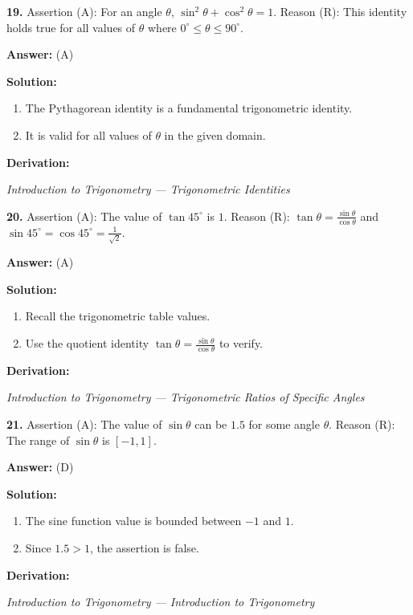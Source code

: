 \documentclass[12pt,a4paper]{exam}
\newcommand{\fitmath}[1]{%
  \sbox{\schmathbox}{$\displaystyle #1$}%
  \ifdim\wd\schmathbox>\linewidth
    \resizebox{\linewidth}{!}{\usebox{\schmathbox}}%
  \else
    \usebox{\schmathbox}%
  \fi}
\begin{document}
\begin{questions}
\question \textbf{19.} Assertion (A): For an angle $\theta$, $\sin^2 \theta + \cos^2 \theta = 1$. Reason (R): This identity holds true for all values of $\theta$ where $0^\circ \le \theta \le 90^\circ$.

\textbf{Answer:}
(A)

\textbf{Solution:}
\begin{enumerate}
  \item The Pythagorean identity is a fundamental trigonometric identity.
  \item It is valid for all values of $\theta$ in the given domain.
\end{enumerate}
\textbf{Derivation:}
\begin{center}
\fitmath{\sin^2 \theta + \cos^2 \theta = 1 \text{ for all } \theta}
\end{center}
\hfill \textit{Introduction to Trigonometry — Trigonometric Identities}
\vspace{0.3cm}

\question \textbf{20.} Assertion (A): The value of $\tan 45^\circ$ is $1$. Reason (R): $\tan \theta = \frac{\sin \theta}{\cos \theta}$ and $\sin 45^\circ = \cos 45^\circ = \frac{1}{\sqrt{2}}$.

\textbf{Answer:}
(A)

\textbf{Solution:}
\begin{enumerate}
  \item Recall the trigonometric table values.
  \item Use the quotient identity $\tan \theta = \frac{\sin \theta}{\cos \theta}$ to verify.
\end{enumerate}
\textbf{Derivation:}
\begin{center}
\fitmath{\tan 45^\circ = \frac{\sin 45^\circ}{\cos 45^\circ} = \frac{1/\sqrt{2}}{1/\sqrt{2}} = 1}
\end{center}
\hfill \textit{Introduction to Trigonometry — Trigonometric Ratios of Specific Angles}
\vspace{0.3cm}

\question \textbf{21.} Assertion (A): The value of $\sin \theta$ can be $1.5$ for some angle $\theta$. Reason (R): The range of $\sin \theta$ is $[-1, 1]$.

\textbf{Answer:}
(D)

\textbf{Solution:}
\begin{enumerate}
  \item The sine function value is bounded between $-1$ and $1$.
  \item Since $1.5 > 1$, the assertion is false.
\end{enumerate}
\textbf{Derivation:}
\begin{center}
\fitmath{-1 \le \sin \theta \le 1}
\end{center}
\hfill \textit{Introduction to Trigonometry — Introduction to Trigonometry}
\vspace{0.3cm}


\end{questions}
\end{document}

